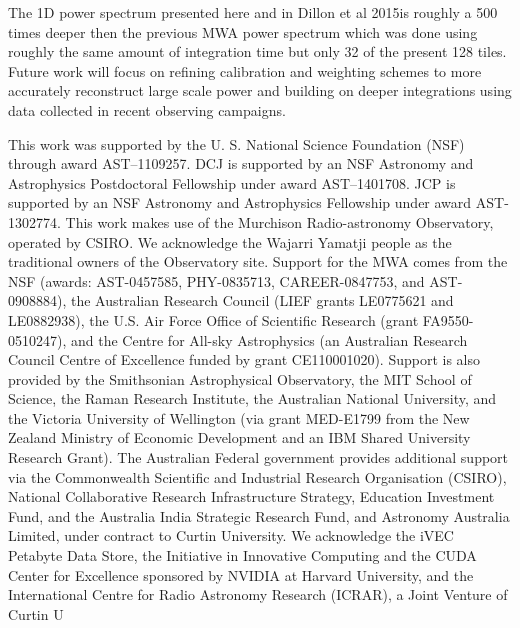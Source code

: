 \documentclass[preprint]{aastex}
\def\dilloncite{Dillon et al 2015}
\begin{document}
The 1D power spectrum presented here and in \dilloncite is roughly a 500 times deeper then the previous MWA power spectrum \cite{Dillon:2014p9788} which was done using roughly the same amount of integration time but only 32 of the present 128 tiles.  Future work will focus on refining calibration and weighting schemes to more accurately reconstruct large scale power and building on deeper integrations using data collected in recent observing campaigns.




\acknowledgments

This work was supported	 by the U. S. National Science Foundation (NSF) through award AST--1109257. DCJ is supported by an NSF Astronomy and Astrophysics Postdoctoral Fellowship under award AST--1401708. JCP is supported by an NSF Astronomy and Astrophysics Fellowship under award AST-1302774. This work makes use of the Murchison Radio-astronomy Observatory, operated by CSIRO. We acknowledge the Wajarri Yamatji people as the traditional owners of the Observatory site. Support for the MWA comes from the NSF (awards: AST-0457585, PHY-0835713, CAREER-0847753, and AST-0908884), the Australian Research Council (LIEF grants LE0775621 and LE0882938), the U.S. Air Force Office of Scientific Research (grant FA9550-0510247), and the Centre for All-sky Astrophysics (an Australian Research Council Centre of Excellence funded by grant CE110001020). Support is also provided by the Smithsonian Astrophysical Observatory, the MIT School of Science, the Raman Research Institute, the Australian National University, and the Victoria University of Wellington (via grant MED-E1799 from the New Zealand Ministry of Economic Development and an IBM Shared University Research Grant). The Australian Federal government provides additional support via the Commonwealth Scientific and Industrial Research Organisation (CSIRO), National Collaborative Research Infrastructure Strategy, Education Investment Fund, and the Australia India Strategic Research Fund, and Astronomy Australia Limited, under contract to Curtin University. We acknowledge the iVEC Petabyte Data Store, the Initiative in Innovative Computing and the CUDA Center for Excellence sponsored by NVIDIA at Harvard University, and the International Centre for Radio Astronomy Research (ICRAR), a Joint Venture of Curtin U

\end{document}
